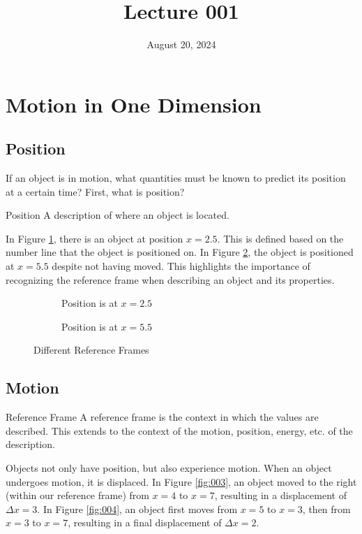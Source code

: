 \documentclass[12pt]{article}
\title{Lecture 001}
\date{August 20, 2024}
\begin{document}
\section{Motion in One Dimension}

\subsection{Position}

If an object is in motion, what quantities must be known to predict its position at a
certain time? First, what is position?

\begin{definition}{Position}
  A description of where an object is located.
\end{definition}

In Figure \ref{fig:001}, there is an object at position $x=2.5$. This is defined based on
the number line that the object is positioned on. In Figure \ref{fig:002}, the object is
positioned at $x=5.5$ despite not having moved. This highlights the importance of recognizing
the reference frame when describing an object and its properties.

\begin{figure}[H]
  \centering
  \begin{subfigure}[H]{0.4\textwidth}
    \centering
    
    \caption{Position is at $x=2.5$}
    \label{fig:001}
  \end{subfigure}
  \begin{subfigure}[H]{0.4\textwidth}
    \centering
    
    \caption{Position is at $x=5.5$}
    \label{fig:002}
  \end{subfigure}
  \caption{Different Reference Frames}
  \label{fig:refFrame}
\end{figure}

\subsection{Motion}

\begin{definition}{Reference Frame}
  A reference frame is the context in which the values are described. This extends to the
  context of the motion, position, energy, etc. of the description.
\end{definition}

Objects not only have position, but also experience motion. When an object undergoes motion,
it is displaced. In Figure \ref{fig:003}, an object moved to the right (within our reference
frame) from $x=4$ to $x=7$, resulting in a displacement of $\Delta x=3$. In Figure
\ref{fig:004}, an object first moves from $x=5$ to $x=3$, then from $x=3$ to $x=7$, resulting
in a final displacement of $\Delta x=2$.
\end{document}
